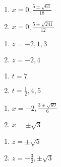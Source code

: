 \documentclass{ximera}
\begin{document}
\begin{multicols}{2}
\begin{enumerate}
\setcounter{enumi}{\value{HW}}

\item  $x = 0, \frac{5\pm \sqrt{61}}{18}$
\item  $x = 0, \frac{5 \pm \sqrt{241}}{12}$

\setcounter{HW}{\value{enumi}}
\end{enumerate}
\end{multicols}

\begin{multicols}{2}
\begin{enumerate}
\setcounter{enumi}{\value{HW}}

\item $z = -2,1,3$
\item $z=-2,4$

\setcounter{HW}{\value{enumi}}
\end{enumerate}
\end{multicols}


\begin{multicols}{2}
\begin{enumerate}
\setcounter{enumi}{\value{HW}}

\item $t=7$
\item $t = \frac{1}{2}, 4, 5$

\setcounter{HW}{\value{enumi}}
\end{enumerate}
\end{multicols}

\begin{multicols}{2}
\begin{enumerate}
\setcounter{enumi}{\value{HW}}

\item $x = -2, \frac{3 \pm \sqrt{69}}{6}$

\item $x = \pm \sqrt{3}$


\setcounter{HW}{\value{enumi}}
\end{enumerate}
\end{multicols}

\begin{multicols}{2}
\begin{enumerate}
\setcounter{enumi}{\value{HW}}

\item $z = \pm \sqrt{5}$

\item $z = -\frac{3}{2}, \pm \sqrt{3}$

\setcounter{HW}{\value{enumi}}
\end{enumerate}
\end{multicols}
\end{document}
